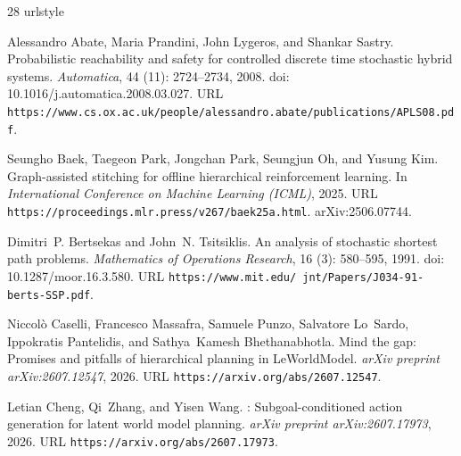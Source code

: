 \documentclass{article}
\theoremstyle{definition}
\theoremstyle{remark}
\begin{document}
\clearpage
\label{sec:references}
\begin{thebibliography}{28}
\providecommand{\natexlab}[1]{#1}
\providecommand{\url}[1]{\texttt{#1}}
\expandafter\ifx\csname urlstyle\endcsname\relax
  \providecommand{\doi}[1]{doi: #1}\else
  \providecommand{\doi}{doi: \begingroup \urlstyle{rm}\Url}\fi

Alessandro Abate, Maria Prandini, John Lygeros, and Shankar Sastry.
\newblock Probabilistic reachability and safety for controlled discrete time
  stochastic hybrid systems.
\newblock \emph{Automatica}, 44 (11): 2724--2734, 2008.
\newblock \doi{10.1016/j.automatica.2008.03.027}.
\newblock URL
  \url{https://www.cs.ox.ac.uk/people/alessandro.abate/publications/APLS08.pdf}.

Seungho Baek, Taegeon Park, Jongchan Park, Seungjun Oh, and Yusung Kim.
\newblock Graph-assisted stitching for offline hierarchical reinforcement
  learning.
\newblock In \emph{International Conference on Machine Learning (ICML)}, 2025.
\newblock URL \url{https://proceedings.mlr.press/v267/baek25a.html}.
\newblock arXiv:2506.07744.

Dimitri~P. Bertsekas and John~N. Tsitsiklis.
\newblock An analysis of stochastic shortest path problems.
\newblock \emph{Mathematics of Operations Research}, 16 (3):
  580--595, 1991.
\newblock \doi{10.1287/moor.16.3.580}.
\newblock URL \url{https://www.mit.edu/~jnt/Papers/J034-91-berts-SSP.pdf}.

Niccol\`o Caselli, Francesco Massafra, Samuele Punzo, Salvatore Lo~Sardo,
  Ippokratis Pantelidis, and Sathya~Kamesh Bhethanabhotla.
\newblock Mind the gap: Promises and pitfalls of hierarchical planning in
  {LeWorldModel}.
\newblock \emph{arXiv preprint arXiv:2607.12547}, 2026.
\newblock URL \url{https://arxiv.org/abs/2607.12547}.

Letian Cheng, Qi~Zhang, and Yisen Wang.
: Subgoal-conditioned action generation for latent world model
  planning.
\newblock \emph{arXiv preprint arXiv:2607.17973}, 2026.
\newblock URL \url{https://arxiv.org/abs/2607.17973}.


\end{thebibliography}
\end{document}
